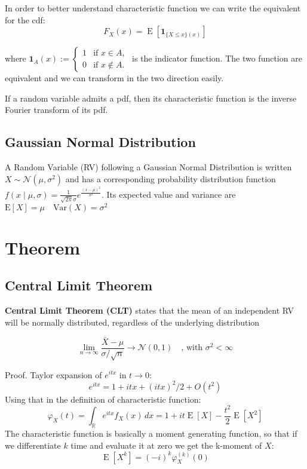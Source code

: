 \documentclass[twocolumn]{article}
\numberwithin{equation}{section}
\begin{document}
In order to better understand characteristic function we can write the equivalent for the cdf:
$$F_X(x) = \operatorname{E} \left [\mathbf{1}_{\{X\leq x\}(x)} \right] $$

where 
$\mathbf{1}_A(x) :=
\begin{cases}
1 &\text{if } x \in A, \\
0 &\text{if } x \notin A.
\end{cases}
$ is the indicator function. The two function are equivalent and we can transform in the two direction easily.

If a random variable admits a pdf, then its characteristic function is the inverse Fourier transform of its pdf.


	\subsection{Gaussian Normal Distribution}
A Random Variable (RV) following a Gaussian Normal Distribution is written $X \sim \mathcal{N}(\mu,\sigma^2)$
and has a corresponding probability distribution function $ f(x\mid \mu,\sigma) =\frac{1}{\sqrt{2\pi}\sigma} e^{\frac{(x-\mu)^2}{\sigma^2}} $.
Its expected value and variance are $ \text{E}[X] = \mu \quad \text{Var}(X) = \sigma^2 $


\section{Theorem}

	\subsection{Central Limit Theorem}
\textbf{Central Limit Theorem (CLT)} states that the mean of an independent RV will be normally distributed, regardless of the underlying distribution
\begin{framed}
$$ \lim_{n \rightarrow \infty}\frac{\bar{X}-\mu}{\sigma/\sqrt{n}} \rightarrow \mathcal{N}(0,1) \quad \text{, with } \sigma^2< \infty$$
\end{framed}

Proof.
Taylor expansion of $e^{itx}$ in $t \rightarrow 0$:
$$ e^{itx} = 1 + itx +  (itx)^2/2 + O(t^2)$$
Using that in the definition of characteristic function:
$$ \varphi_X(t) = \int_{\mathbb{R}} e^{itx} f_X(x)\,dx = 1 + it \operatorname{E}[X] - \frac{t^2}{2}\operatorname{E}[X^2]$$ 
The characteristic function is basically a moment generating function, so that if we differentiate $k$ time and evaluate it at zero we get the k-moment of $X$:
$$\operatorname{E}[X^k] = (-i)^k \varphi_X^{(k)}(0)$$
\end{document}
